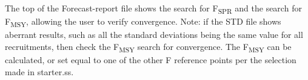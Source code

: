 The top of the Forecast-report file shows the search for F\textsubscript {SPR}  and the search for F\textsubscript {MSY}, allowing the user to verify convergence. Note: if the STD file shows aberrant results, such as all the standard deviations being the same value for all recruitments, then check the F\textsubscript {MSY} search for convergence. The F\textsubscript {MSY} can be calculated, or set equal to one of the other F reference points per the selection made in starter.ss.



	


